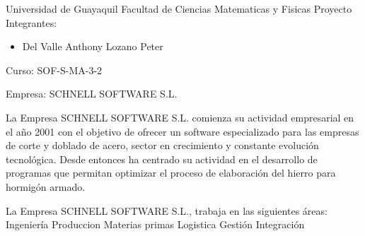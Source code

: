 \begin{center}
Universidad de Guayaquil
Facultad de Ciencias Matematicas y Fisicas
Proyecto
Integrantes:
\begin{itemize}
	\item Del Valle Anthony
Lozano Peter
\end{itemize}
Curso: SOF-S-MA-3-2
\end{center}

Empresa: SCHNELL SOFTWARE S.L.


La Empresa SCHNELL SOFTWARE S.L. comienza su actividad empresarial en el año 2001 con el objetivo de ofrecer un software especializado para las empresas de corte y doblado de acero, sector en crecimiento y constante evolución tecnológica. Desde entonces ha centrado su actividad en el desarrollo de programas que permitan optimizar el proceso de elaboración del hierro para hormigón armado.

La Empresa SCHNELL SOFTWARE S.L., trabaja en las siguientes áreas:
Ingeniería
Produccion
Materias primas
Logistica
Gestión
Integración

